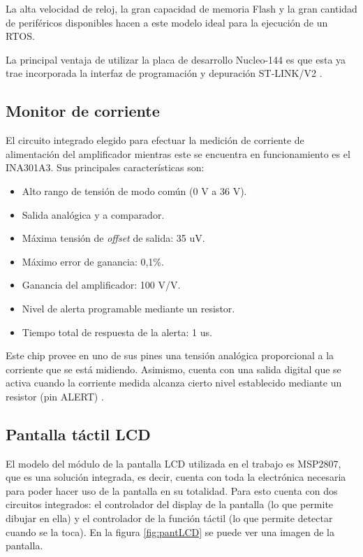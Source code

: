 La alta velocidad de reloj, la gran capacidad de memoria Flash y la gran cantidad de periféricos disponibles hacen a este modelo ideal para la ejecución de un RTOS.

La principal ventaja de utilizar la placa de desarrollo Nucleo-144 es que esta ya trae incorporada la interfaz de programación y depuración ST-LINK/V2 \citep{NUCLEO144}.

\subsection{Monitor de corriente}

El circuito integrado elegido para efectuar la medición de corriente de alimentación del amplificador mientras este se encuentra en funcionamiento es el INA301A3. Sus principales características son:

\begin{itemize}
\item Alto rango de tensión de modo común (0 V a 36 V).
\item Salida analógica y a comparador.
\item Máxima tensión de \textit{offset} de salida: 35 uV.
\item Máximo error de ganancia: 0,1\%.
\item Ganancia del amplificador: 100 V/V.
\item Nivel de alerta programable mediante un resistor.
\item Tiempo total de respuesta de la alerta: 1 us.
\end{itemize}

Este chip provee en uno de sus pines una tensión analógica proporcional a la corriente que se está midiendo. Asimismo, cuenta con una salida digital que se activa cuando la corriente medida alcanza cierto nivel establecido mediante un resistor (pin ALERT) \citep{INA301}.

\subsection{Pantalla táctil LCD}
\label{sec:pantLCD}

El modelo del módulo de la pantalla LCD utilizada en el trabajo es MSP2807, que es una solución integrada, es decir, cuenta con toda la electrónica necesaria para poder hacer uso de la pantalla en su totalidad. Para esto cuenta con dos circuitos integrados: el controlador del display de la pantalla (lo que permite dibujar en ella) y el controlador de la función táctil (lo que permite detectar cuando se la toca). En la figura \ref{fig:pantLCD} se puede ver una imagen de la pantalla.


